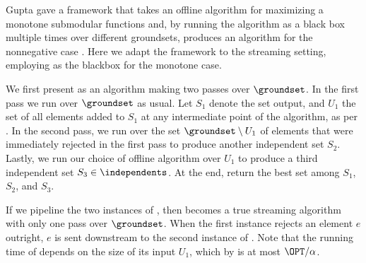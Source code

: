 \documentclass[oneside,letterpaper]{scrartcl} \usepackage{macros}
\begin{document}
Gupta \etal gave a framework that takes an offline algorithm for
maximizing a monotone submodular functions and, by running the
algorithm as a black box multiple times over different groundsets,
produces an algorithm for the nonnegative case \cite{grst-10}. Here we
adapt the framework to the streaming setting, employing
 as the blackbox for the monotone case.




We first present  as an algorithm
making two passes over $\groundset$. In the first pass we run
 over $\groundset$ as
usual.  Let $S_1$ denote the set output, and $U_1$ the set of all
elements added to $S_1$ at any intermediate point of the algorithm, as
per . In the second pass, we run
 over the set $\groundset
\setminus U_1$ of elements that were immediately rejected in the first
pass to produce another independent set $S_2$. Lastly, we run our
choice of offline algorithm over $U_1$ to produce a third independent
set $S_3 \in \independents$. At the end, return the best set among
$S_1$, $S_2$, and $S_3$.

If we pipeline the two instances of , then
 becomes a true streaming algorithm
with only one pass over $\groundset$. When the first instance rejects
an element $e$ outright, $e$ is sent downstream to the second instance
of . Note that the running time of
 depends on the size of its input $U_1$, which by
 is at most $\OPT/\alpha$.
\end{document}
